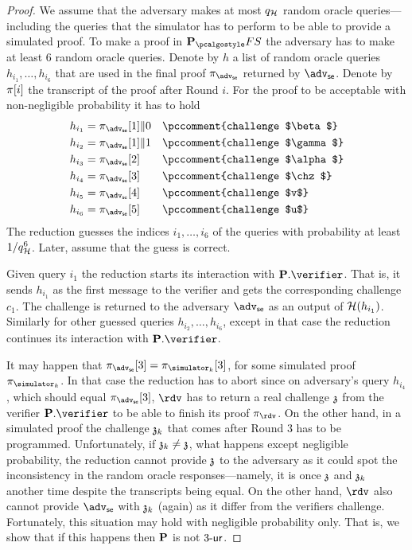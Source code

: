 \documentclass[runningheads,11pt]{llncs}
\theoremstyle{definition}
\begin{document}
\begin{proof}
	We assume that the adversary makes at most $q_{\mathcal{H}}$ random oracle
  queries---including the queries that the simulator has to perform to be able
  to provide a simulated proof. 
	To make a proof in $\plonkprotfs$ the adversary has to make at least $6$ random oracle queries. 
	Denote by $h$ a list of random oracle queries $h_{i_1}, \ldots, h_{i_6}$ that are used in the final proof $\zkproof_{\advse}$ returned by $\advse$.
	Denote by $\pi[i]$ the transcript of the proof after Round $i$. 
	For the proof to be acceptable with non-negligible probability it has to hold
	\begin{align*}
		h_{i_1} & = \zkproof_{\advse}[1] \| 0 \quad \pccomment{challenge $\beta$}\\
		h_{i_2} & = \zkproof_{\advse}[1] \| 1 \quad \pccomment{challenge $\gamma$}\\
		h_{i_3} & = \zkproof_{\advse}[2] \qquad \pccomment{challenge $\alpha$}\\
		h_{i_4} & = \zkproof_{\advse}[3] \qquad \pccomment{challenge $\chz$}\\
		h_{i_5} & = \zkproof_{\advse}[4] \qquad \pccomment{challenge $v$}\\
		h_{i_6} & = \zkproof_{\advse}[5] \qquad \pccomment{challenge $u$}
	\end{align*}
	The reduction guesses the indices $i_1, \ldots, i_6$ of the queries with probability at least $1 / q_{\mathcal{H}}^6$. Later, assume that the guess is correct.
	
	Given query $i_1$ the reduction starts its interaction with $\plonkprot.\verifier$. That is, it sends $h_{i_1}$ as the first message to the verifier and gets the corresponding challenge $c_1$. The challenge is returned to the adversary $\advse$ as an output of $\mathcal{H}(h_{i_1})$. 
	Similarly for other guessed queries $h_{i_2}, \ldots, h_{i_6}$, except in that
  case the reduction continues its interaction with $\plonkprot.\verifier$.
	
	It may happen that $\zkproof_{\advse}[3] =\zkproof_{\simulator_k}[3]$, for some simulated proof $\zkproof_{\simulator_k}$.
	In that case the reduction has to abort since 
	on adversary's query $h_{i_4}$, which should equal $\zkproof_{\advse}[3]$, $\rdv$ has to return a real challenge $\mathfrak{z}$ from the verifier $\plonkprot.\verifier$ to be able to finish its proof $\zkproof_\rdv$. 
	On the other hand, in a simulated proof the challenge $\mathfrak{z}_k$ that comes after Round 3 has to be programmed. 
	Unfortunately, if $\mathfrak{z}_k \neq \mathfrak{z}$, what happens except negligible probability, the reduction cannot provide $\mathfrak{z}$ to the adversary as it could spot the inconsistency in the random oracle responses---namely, it is once $\mathfrak{z}$ and $\mathfrak{z}_k$ another time despite the transcripts being equal. On the other hand, $\rdv$ also cannot provide $\advse$ with $\mathfrak{z}_k$ (again) as it differ from the verifiers challenge.
	Fortunately, this situation may hold with negligible probability only. That is, we show that if this happens then $\mathbf{P}$ is not ${3\text{-}\mathsf{ur}}$.
			

\end{proof}
\end{document}

